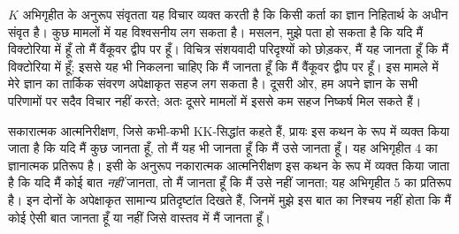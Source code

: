 \documentclass[../../../include/open-logic-section]{subfiles}
\begin{document}
$K$ अभिगृहीत के अनुरूप संवृतता यह विचार व्यक्त करती है कि किसी कर्ता का
ज्ञान निहितार्थ के अधीन संवृत है। कुछ मामलों में यह विश्वसनीय लग सकता है।
मसलन, मुझे पता हो सकता है कि यदि मैं विक्टोरिया में हूँ तो मैं वैंकूवर द्वीप
पर हूँ। विचित्र संशयवादी परिदृश्यों को छोड़कर, मैं यह जानता हूँ कि मैं
विक्टोरिया में हूँ; इससे यह भी निकलना चाहिए कि मैं जानता हूँ कि मैं वैंकूवर
द्वीप पर हूँ। इस मामले में मेरे ज्ञान का तार्किक संवरण अपेक्षाकृत सहज लग
सकता है। दूसरी ओर, हम अपने ज्ञान के सभी परिणामों पर सदैव विचार नहीं करते;
अतः दूसरे मामलों में इससे कम सहज निष्कर्ष मिल सकते हैं।

सकारात्मक आत्मनिरीक्षण, जिसे कभी-कभी KK-सिद्धांत कहते हैं, प्रायः इस कथन
के रूप में व्यक्त किया जाता है कि यदि मैं कुछ जानता हूँ, तो मैं यह भी जानता
हूँ कि मैं उसे जानता हूँ। यह अभिगृहीत 4 का ज्ञानात्मक प्रतिरूप है। इसी के
अनुरूप नकारात्मक आत्मनिरीक्षण इस कथन के रूप में व्यक्त किया जाता है कि यदि
मैं कोई बात \emph{नहीं} जानता, तो मैं जानता हूँ कि मैं उसे नहीं जानता; यह
अभिगृहीत 5 का प्रतिरूप है। इन दोनों के अपेक्षाकृत सामान्य प्रतिदृष्टांत
दिखते हैं, जिनमें मुझे इस बात का निश्चय नहीं होता कि मैं कोई ऐसी बात जानता
हूँ या नहीं जिसे वास्तव में मैं जानता हूँ।
\end{document}
